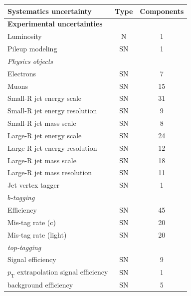 \begin{table}[hp]
  \centering
  \begin{tabular*}{150mm}{@{\extracolsep{\fill}}lcc}
    \hline\hline
    \textbf{Systematics uncertainty} & \textbf{Type} & \textbf{Components}\\
    \hline
    \textbf{Experimental uncertainties} & &\\
    \hline
    \multicolumn{1}{l}{Luminosity}       &  N & 1\\
    \multicolumn{1}{l}{Pileup modeling} & SN & 1\\
    \hline
    \textit{Physics objects} & &\\
    \multicolumn{1}{l}{Electrons}                     & SN &  7\\
    \multicolumn{1}{l}{Muons}                         & SN & 15\\
    \multicolumn{1}{l}{Small-R jet energy scale}      & SN & 31\\
    \multicolumn{1}{l}{Small-R jet energy resolution} & SN &  9\\
    \multicolumn{1}{l}{Small-R jet mass scale}        & SN &  8\\
    \multicolumn{1}{l}{Large-R jet energy scale}      & SN & 24\\
    \multicolumn{1}{l}{Large-R jet energy resolution} & SN & 12\\
    \multicolumn{1}{l}{Large-R jet mass scale}        & SN & 18\\
    \multicolumn{1}{l}{Large-R jet mass resolution}   & SN & 11\\
    \multicolumn{1}{l}{Jet vertex tagger}             & SN &  1\\
    \hline
    \textit{$b$-tagging} & &\\
    \multicolumn{1}{l}{Efficiency}           & SN & 45\\
    \multicolumn{1}{l}{Mis-tag rate (c)}     & SN & 20\\
    \multicolumn{1}{l}{Mis-tag rate (light)} & SN & 20\\
    \hline
    \textit{top-tagging} & &\\
    \multicolumn{1}{l}{Signal efficiency}                            & SN &  9\\
    \multicolumn{1}{l}{$p_\text{T}$ extrapolation signal efficiency} & SN &  1\\
    \multicolumn{1}{l}{background efficiency}                        & SN &  5\\

\end{tabular*}
\end{table}
